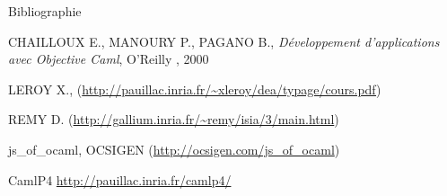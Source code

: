 \documentclass[xcolor={table,dvipsnames}]{beamer}
\begin{document}
\begin{frame}{Bibliographie}

  \begin{thebibliography}{}
   CHAILLOUX E., MANOURY P., PAGANO B., \emph{Développement
    d'applications avec Objective Caml}, O'Reilly
    , 2000


 LEROY X., \emph{} (\url{http://pauillac.inria.fr/~xleroy/dea/typage/cours.pdf})

 REMY D. (\url{http://gallium.inria.fr/~remy/isia/3/main.html})

 js\_of\_ocaml, OCSIGEN (\url{http://ocsigen.com/js_of_ocaml})

 CamlP4 \url{http://pauillac.inria.fr/camlp4/}
  \end{thebibliography}
\end{frame}
\end{document}

